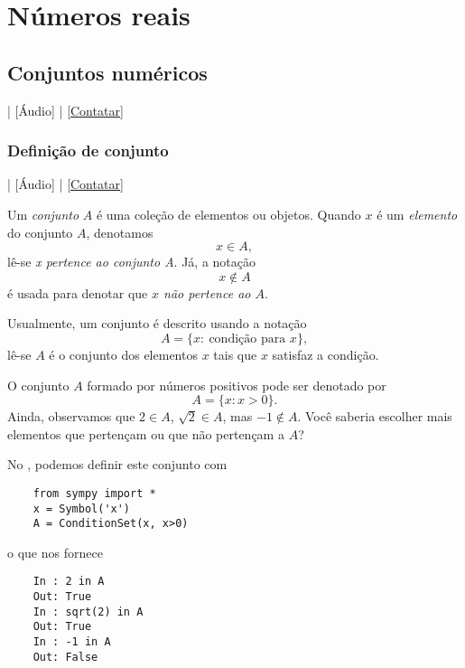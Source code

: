 

\chapter{Números reais}\label{cap_numreal}
\thispagestyle{fancy}

\section{Conjuntos numéricos}\label{cap_numreal_sec_funconj}

\begin{flushright}
  [Vídeo] | [Áudio] | \href{https://phkonzen.github.io/notas/contato.html}{[Contatar]}
\end{flushright}

\subsection{Definição de conjunto}

\begin{flushright}
  [Vídeo] | [Áudio] | \href{https://phkonzen.github.io/notas/contato.html}{[Contatar]}
\end{flushright}

Um \emph{conjunto} $A$ é uma coleção de elementos ou objetos. Quando $x$ é um \emph{elemento} do conjunto $A$, denotamos
\begin{equation}
  x\in A,
\end{equation}
lê-se \emph{x pertence ao conjunto A}. Já, a notação
\begin{equation}
  x\not\in A
\end{equation}
é usada para denotar que \emph{$x$ não pertence ao $A$}.

Usualmente, um conjunto é descrito usando a notação
\begin{equation}
  A = \{x:~\text{condição para }x\},
\end{equation}
lê-se $A$ é o conjunto dos elementos $x$ tais que $x$ satisfaz a condição.

\begin{ex}
  O conjunto $A$ formado por números positivos pode ser denotado por
  \begin{equation}
    A = \{x: x>0\}.
  \end{equation}
  Ainda, observamos que $2\in A$, $\sqrt{2}\in A$, mas $-1\not\in A$. Você saberia escolher mais elementos que pertençam ou que não pertençam a $A$?

  \ifispython
  No \python, podemos definir este conjunto com
  \begin{lstlisting}
    from sympy import *
    x = Symbol('x')
    A = ConditionSet(x, x>0)
  \end{lstlisting}
  o que nos fornece
  \begin{lstlisting}
    In : 2 in A
    Out: True
    In : sqrt(2) in A
    Out: True
    In : -1 in A
    Out: False
  \end{lstlisting}
  \fi
\end{ex}

